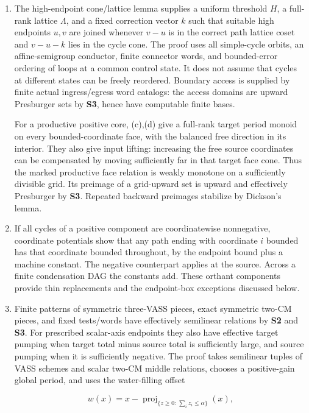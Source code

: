 \documentclass[11pt,a4paper]{article}
\theoremstyle{remark}
\DeclareMathOperator{\proj}{proj}
\begin{document}
\begin{enumerate}[label=\textup{(\alph*)},leftmargin=*]
\item\label{item:ingredient-d} The high-endpoint cone/lattice lemma supplies a uniform threshold \(H\), a full-rank lattice \(\Lambda\), and a fixed correction vector \(k\) such that suitable high endpoints \(u,v\) are joined whenever \(v-u\) is in the correct path lattice coset and \(v-u-k\) lies in the cycle cone. The proof uses all simple-cycle orbits, an affine-semigroup conductor, finite connector words, and bounded-error ordering of loops at a common control state. It does not assume that cycles at different states can be freely reordered. Boundary access is supplied by finite actual ingress/egress word catalogs: the access domains are upward Presburger sets by \textbf{S3}, hence have computable finite bases.

For a productive positive core, (c),(d) give a full-rank target period monoid on every bounded-coordinate face, with the balanced free direction in its interior. They also give input lifting: increasing the free source coordinates can be compensated by moving sufficiently far in that target face cone. Thus the marked productive face relation is weakly monotone on a sufficiently divisible grid. Its preimage of a grid-upward set is upward and effectively Presburger by \textbf{S3}. Repeated backward preimages stabilize by Dickson's lemma.

\item\label{item:ingredient-e} If all cycles of a positive component are coordinatewise nonnegative, coordinate potentials show that any path ending with coordinate \(i\) bounded has that coordinate bounded throughout, by the endpoint bound plus a machine constant. The negative counterpart applies at the source. Across a finite condensation DAG the constants add. These orthant components provide thin replacements and the endpoint-box exceptions discussed below.

\item\label{item:ingredient-f} Finite patterns of symmetric three-VASS pieces, exact symmetric two-CM pieces, and fixed tests/words have effectively semilinear relations by \textbf{S2} and \textbf{S3}. For prescribed scalar-axis endpoints they also have effective target pumping when target total minus source total is sufficiently large, and source pumping when it is sufficiently negative. The proof takes semilinear tuples of VASS schemes and scalar two-CM middle relations, chooses a positive-gain global period, and uses the water-filling offset

\begin{equation*}
w(x)=x-\proj_{\{z\geq 0:\,\sum_i z_i\leq\alpha\}}(x),
\end{equation*}



\end{enumerate}
\end{document}

